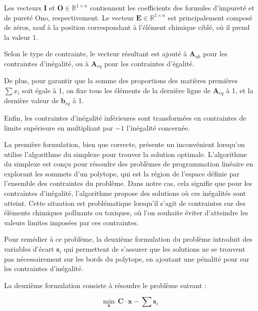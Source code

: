 \documentclass[12pt]{article}
\begin{document}
Les vecteurs $\mathbf{I}$ et $\mathbf{O} \in \mathbb{R}^{1 \times n}$ 
contiennent les coefficients des formules d'impureté et de pureté Ono, 
respectivement. Le vecteur $\mathbf{E} \in \mathbb{R}^{1 \times n}$ est 
principalement composé de zéros, sauf à la position correspondant à 
l'élément chimique ciblé, où il prend la valeur 1.

Selon le type de contrainte, le vecteur résultant est ajouté à 
$\mathbf{A}_{ub}$ pour les contraintes d'inégalité, ou à $\mathbf{A}_{eq}$ 
pour les contraintes d'égalité.

De plus, pour garantir que la somme des proportions des matières premières 
$\sum x_i$ soit égale à 1, on fixe tous les éléments de la dernière ligne 
de $\mathbf{A}_{eq}$ à 1, et la dernière valeur de $\mathbf{b}_{eq}$ à 1.

Enfin, les contraintes d'inégalité inférieures sont transformées en 
contraintes de limite supérieure en multipliant par $-1$ l'inégalité 
concernée.








La première formulation, bien que correcte, présente un inconvénient 
lorsqu'on utilise l'algorithme du simplexe pour trouver la solution 
optimale. 
L'algorithme du simplexe est conçu pour résoudre des problèmes de 
programmation linéaire en explorant les sommets d'un polytope, qui est 
la région de l'espace définie par l'ensemble des contraintes du problème.
Dans notre cas, cela signifie que pour les contraintes d'inégalité, 
l'algorithme propose des solutions où ces inégalités
sont atteint. Cette situation est problématique lorsqu'il 
s'agit de contraintes sur des éléments chimiques polluants ou toxiques, 
où l'on souhaite éviter d'atteindre les valeurs limites imposées par ces 
contraintes.



Pour remédier à ce problème, la deuxième formulation du 
problème introduit des variables d'écart $\mathbf{s}_i$
qui permettent de s'assurer que les solutions ne se trouvent pas 
nécessairement sur les bords du polytope, en ajoutant une pénalité pour 
sur les contraintes d'inégalité.



La deuxième formulation consiste à résoudre le problème suivant :

\[
\underset{\mathbf{x}}{\min} \, \mathbf{C} \cdot \mathbf{x} - \sum \mathbf{s}_i
\]
\end{document}
